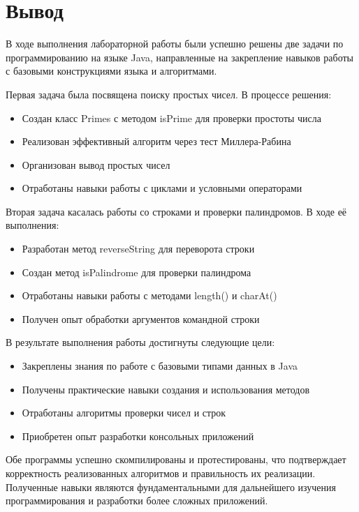 \chapter*{Вывод}
\label{ch:Conclusion}

В ходе выполнения лабораторной работы были успешно решены две задачи по программированию на языке Java, направленные на закрепление навыков работы с базовыми конструкциями языка и алгоритмами.

Первая задача была посвящена поиску простых чисел. В процессе решения:

\begin{itemize}
  \item{Создан класс Primes с методом isPrime для проверки простоты числа}
  \item{Реализован эффективный алгоритм через тест Миллера-Рабина}
  \item{Организован вывод простых чисел}
  \item{Отработаны навыки работы с циклами и условными операторами}
\end{itemize}

Вторая задача касалась работы со строками и проверки палиндромов. В ходе её выполнения:

\begin{itemize}
\item{Разработан метод reverseString для переворота строки}
\item{Создан метод isPalindrome для проверки палиндрома}
\item{Отработаны навыки работы с методами length() и charAt()}
\item{Получен опыт обработки аргументов командной строки}
\end{itemize}

В результате выполнения работы достигнуты следующие цели:

\begin{itemize}
\item{Закреплены знания по работе с базовыми типами данных в Java}
\item{Получены практические навыки создания и использования методов}
\item{Отработаны алгоритмы проверки чисел и строк}
\item{Приобретен опыт разработки консольных приложений}
\end{itemize}

Обе программы успешно скомпилированы и протестированы, что подтверждает корректность реализованных алгоритмов и правильность их реализации. Полученные навыки являются фундаментальными для дальнейшего изучения программирования и разработки более сложных приложений.

\endinput



